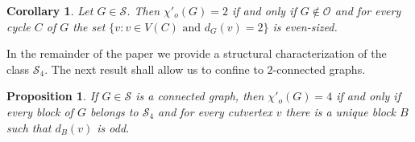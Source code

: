 \documentclass[a4paper,12pt]{article}
\newtheorem{corollary}[theorem]{Corollary}
\newtheorem{proposition}[theorem]{Proposition}
\numberwithin{equation}{section}
\begin{document}
\begin{corollary}
    \label{odd 2-edge-colorability}
Let $G\in\mathcal{S}$. Then $\chi'_o(G)=2$ if and only if $G\notin\mathcal{O}$ and for every cycle $C$ of $G$ the set $\{v:v\in V(C) \text{ and } d_G(v)=2\}$ is even-sized.
\end{corollary}

In the remainder of the paper we provide a structural characterization of the class $\mathcal{S}_4$. The next result shall allow us to confine to $2$-connected graphs.

 \begin{proposition}
    \label{block tree}
 If $G\in\mathcal{S}$ is a connected graph, then  $\chi'_o(G)=4$ if and only if every block of $G$ belongs to $\mathcal{S}_4$ and for every cutvertex $v$ there is a unique block $B$ such that $d_B(v)$ is odd.

\end{proposition}
\end{document}
